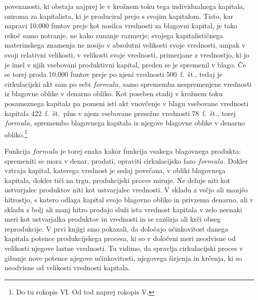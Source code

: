 \documentclass[kapital_02.tex]{subfiles}
\begin{document}
povezanosti, ki obstaja najprej le v krožnem toku tega individualnega kapitala, oziroma za kapitalista, ki je produciral prejo s svojim kapitalom. Tisto, kar napravi 10.000 funtov preje kot nosilca vrednosti za blagovni kapital, je tako rekoč samo notranje, ne kako zunanje razmerje; svojega kapitalističnega materinskega znamenja ne nosijo v absolutni velikosti svoje vrednosti, ampak v svoji relativni velikosti, v velikosti svoje vrednosti, primerjane z vrednostjo, ki jo je imel v njih vsebovani produktivni kapital, preden se je spremenil v blago. Če se torej proda 10.000 funtov preje po njeni vrednosti 500~f.~št., tedaj je cirkulacijski akt sam po sebi \( formula \), samo sprememba nespremenjene vrednosti iz blagovne oblike v denarno obliko. Kot poseben stadij v krožnem toku posameznega kapitala pa pomeni isti akt vnovčenje v blagu vsebovane vrednosti kapitala 422~f.~št.\ plus v njem vsebovane presežne vrednosti 78~f.~št., torej \( formula \), spremembo blagovnega kapitala iz njegove blagovne oblike v denarno obliko.\footnote{Do tu rokopis VI. Od tod naprej rokopis V.}

Funkcija \( formula \) je torej enaka kakor funkcija vsakega blagovnega produkta: spremeniti se mora v denar, prodati, opraviti cirkulacijsko fazo \( formula \). Dokler vztraja kapital, katerega vrednost je sedaj povečana, v obliki blagovnega kapitala, dokler tiči na trgu, produkcijski proces miruje. Ne deluje niti kot ustvarjalec produktov niti kot ustvarjalec vrednosti. V skladu z večjo ali manjšo hitrostjo, s katero odlaga kapital svojo blagovno obliko in privzema denarno, ali v skladu z bolj ali manj hitro prodajo služi ista vrednost kapitala v zelo neenaki meri kot ustvarjalka produktov in vrednosti in se razširja ali krči obseg reprodukcije. V prvi knjigi smo pokazali, da določajo učinkovitost danega kapitala potence produkcijskega procesa, ki so v določeni meri neodvisne od velikosti njegove lastne vrednosti. Tu vidimo, da spravlja cirkulacijski proces v gibanje nove potence njegove učinkovitosti, njegovega širjenja in krčenja, ki so neodvisne od velikosti vrednosti kapitala.
\end{document}
